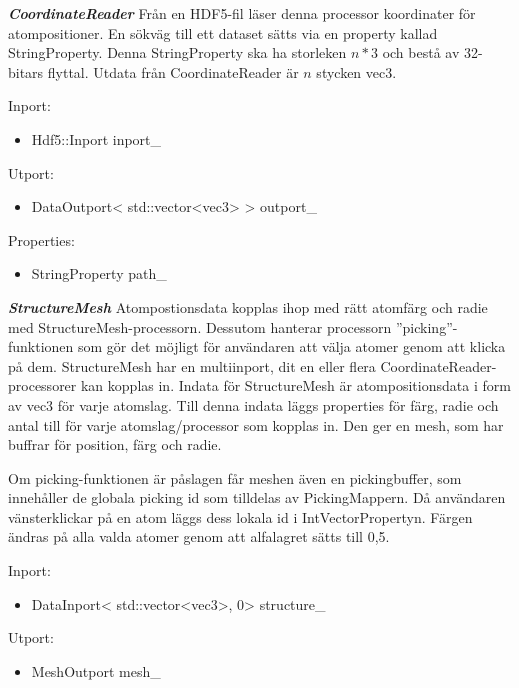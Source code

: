 \documentclass[a4paper,12pt]{article}
\begin{document}
\textbf{\textit{CoordinateReader}} \newline
Från en HDF5-fil läser denna processor koordinater för atompositioner. En sökväg till ett dataset sätts via en property kallad StringProperty. Denna StringProperty ska ha storleken $n*3$ och bestå av 32-bitars flyttal. Utdata från CoordinateReader är $n$ stycken vec3.

Inport:
\begin{itemize}
\item Hdf5::Inport inport\_
\end{itemize}

Utport:
\begin{itemize}
\item DataOutport< std::vector<vec3> > outport\_
\end{itemize}

Properties:
\begin{itemize}
\item StringProperty path\_
\end{itemize}

\textbf{\textit{StructureMesh}} \newline
Atompostionsdata kopplas ihop med rätt atomfärg och radie med StructureMesh-processorn. Dessutom hanterar processorn ''picking''-funktionen som gör det möjligt för användaren att välja atomer genom att klicka på dem. StructureMesh har en multiinport, dit en eller flera CoordinateReader-processorer kan kopplas in. Indata för StructureMesh är atompositionsdata i form av vec3 för varje atomslag. Till denna indata läggs properties för färg, radie och antal till för varje atomslag/processor som kopplas in. Den ger en mesh, som har buffrar för position, färg och radie.

Om picking-funktionen är påslagen får meshen även en pickingbuffer, som innehåller de globala picking id som tilldelas av PickingMappern. Då användaren vänsterklickar på en atom läggs dess lokala id i IntVectorPropertyn. Färgen ändras på alla valda atomer genom att alfalagret sätts till 0,5.

Inport:
\begin{itemize}
\item DataInport< std::vector<vec3>, 0> structure\_
\end{itemize}

Utport:
\begin{itemize}
\item MeshOutport mesh\_
\end{itemize}
\end{document}
